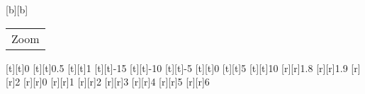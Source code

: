 [b][b]{\fontsize{10}{15}\selectfont \color[rgb]{0,0,0}\setlength{\tabcolsep}{0pt}\begin{tabular}{c}Zoom\end{tabular}}%
%
\fontsize{10}{15}%
\selectfont%
%
[t][t]{0}%
[t][t]{0.5}%
[t][t]{1}%
[t][t]{-15}%
[t][t]{-10}%
[t][t]{-5}%
[t][t]{0}%
[t][t]{5}%
[t][t]{10}%
%
[r][r]{1.8}%
[r][r]{1.9}%
[r][r]{2}%
[r][r]{0}%
[r][r]{1}%
[r][r]{2}%
[r][r]{3}%
[r][r]{4}%
[r][r]{5}%
[r][r]{6}%
%
%
